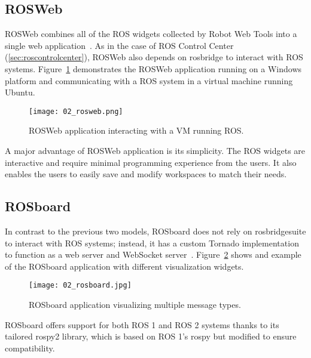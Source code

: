     \subsection{ROSWeb}

        ROSWeb combines all of the \ac{ROS} widgets collected by Robot Web Tools into a single web application~\cite{rosweb}. As in the case of ROS Control Center (\ref{sec:roscontrolcenter}), ROSWeb also depends on \textsf{rosbridge} to interact with \ac{ROS} systems. Figure~\ref{fig:rosweb} demonstrates the ROSWeb application running on a Windows platform and communicating with a \ac{ROS} system in a virtual machine running Ubuntu.

        \begin{figure}[htbp]
            \centering
            \texttt{[image: 02\_rosweb.png]}
            \caption{ROSWeb application interacting with a \ac{VM} running \ac{ROS}.}
            \label{fig:rosweb}
        \end{figure}

        A major advantage of ROSWeb application is its simplicity. The \ac{ROS} widgets are interactive and require minimal programming experience from the users. It also enables the users to easily save and modify workspaces to match their needs.

    \subsection{ROSboard}

        In contrast to the previous two models, ROSboard does not rely on \textsf{rosbridge\smallunderscore  suite} to interact with \ac{ROS} systems; instead, it has a custom \textsf{Tornado} implementation to function as a web server and WebSocket server~\cite{rosboard}. Figure~\ref{fig:rosboard} shows and example of the ROSboard application with different visualization widgets.

        \begin{figure}[htbp]
            \centering
            \texttt{[image: 02\_rosboard.jpg]}
            \caption{ROSboard application visualizing multiple message types.}
            \label{fig:rosboard}
        \end{figure}

        ROSboard offers support for both \ac{ROS} 1 and \ac{ROS} 2 systems thanks to its tailored \textsf{rospy2} library, which is based on \ac{ROS} 1's \textsf{rospy} but modified to ensure compatibility.


